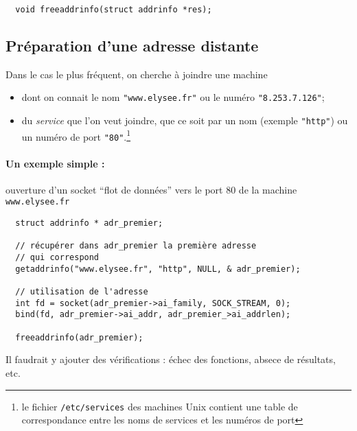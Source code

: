 \begin{lstlisting}
  void freeaddrinfo(struct addrinfo *res);
\end{lstlisting}


\subsection{Préparation d'une adresse distante}

Dans le cas le plus fréquent, on cherche à joindre une machine

\begin{itemize}
\item dont on connait le nom  \texttt{"www.elysee.fr"} ou le numéro
  \texttt{"8.253.7.126"};
\item  du \emph{service} que l'on veut joindre, que ce soit par un nom
  (exemple \texttt{"http"}) ou un numéro de port \texttt{"80"}.\footnote{
  le fichier \texttt{/etc/services} des machines Unix
  contient une table de correspondance entre les noms de services et les
  numéros de port}
\end{itemize}


\paragraph{Un exemple simple : } ouverture d'un socket ``flot de données''
vers le port 80 de la machine \texttt{www.elysee.fr}

\begin{lstlisting}
  struct addrinfo * adr_premier;

  // récupérer dans adr_premier la première adresse
  // qui correspond
  getaddrinfo("www.elysee.fr", "http", NULL, & adr_premier);

  // utilisation de l'adresse
  int fd = socket(adr_premier->ai_family, SOCK_STREAM, 0);
  bind(fd, adr_premier->ai_addr, adr_premier_>ai_addrlen);

  freeaddrinfo(adr_premier);
\end{lstlisting}

Il faudrait y ajouter des vérifications : échec des fonctions, absece
de résultats, etc.



